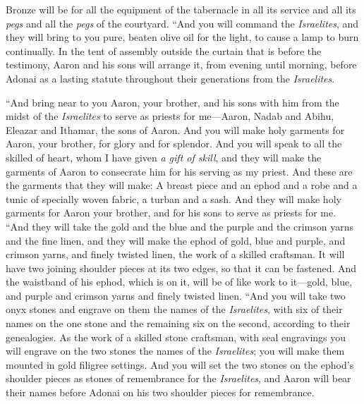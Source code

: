 \begin{biblechapter}
\verse Bronze will be for all the equipment of the tabernacle in all its service and all its \textit{pegs} and all the \textit{pegs} of the courtyard.
 “And you will command the \textit{Israelites}, and they will bring to you pure, beaten olive oil for the light, to cause a lamp to burn continually.
\verse In the tent of assembly outside the curtain that is before the testimony, Aaron and his sons will arrange it, from evening until morning, before Adonai as a lasting statute throughout their generations from the \textit{Israelites}.
\end{biblechapter}

\begin{biblechapter} %
 “And bring near to you Aaron, your brother, and his sons with him from the midst of the \textit{Israelites} to serve as priests for me—Aaron, Nadab and Abihu, Eleazar and Ithamar, the sons of Aaron.
\verse And you will make holy garments for Aaron, your brother, for glory and for splendor.
\verse And you will speak to all the skilled of heart, whom I have given \textit{a gift of skill}, and they will make the garments of Aaron to consecrate him for his serving as my priest.
\verse And these are the garments that they will make: A breast piece and an ephod and a robe and a tunic of specially woven fabric, a turban and a sash. And they will make holy garments for Aaron your brother, and for his sons to serve as priests for me.
\verse “And they will take the gold and the blue and the purple and the crimson yarns and the fine linen,
\verse and they will make the ephod of gold, blue and purple, and crimson yarns, and finely twisted linen, the work of a skilled craftsman.
\verse It will have two joining shoulder pieces at its two edges, so that it can be fastened.
\verse And the waistband of his ephod, which is on it, will be of like work to it—gold, blue, and purple and crimson yarns and finely twisted linen.
\verse “And you will take two onyx stones and engrave on them the names of the \textit{Israelites},
\verse with six of their names on the one stone and the remaining six on the second, according to their genealogies.
\verse As the work of a skilled stone craftsman, with seal engravings you will engrave on the two stones the names of the \textit{Israelites}; you will make them mounted in gold filigree settings.
\verse And you will set the two stones on the ephod’s shoulder pieces as stones of remembrance for the \textit{Israelites}, and Aaron will bear their names before Adonai on his two shoulder pieces for remembrance.

\end{biblechapter}
